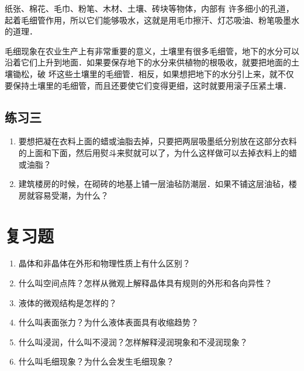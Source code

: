 纸张、棉花、毛巾、粉笔、木材、土壤、砖块等物体，内部有
许多细小的孔道，起着毛细管作用，所以它们能够吸水，这就是用毛巾擦汗、灯芯吸油、粉笔吸墨水的道理．

毛细现象在农业生产上有非常重要的意义，土壤里有很多毛细管，地下的水分可以沿着它们上升到地面．如果要保存地下的水分来供植物的根吸收，就要把地面的土壤锄松，破
坏这些土壤里的毛细管．相反，如果想把地下的水分引上来，就不仅要保持土壤里的毛细管，而且还要使它们变得更细，这时就要用滚子压紧土壤．

\subsection*{练习三}
\begin{enumerate}
\item 要想把凝在衣料上面的蜡或油脂去掉，只要把两层吸墨纸分别放在这部分衣料的上面和下面，然后用熨斗来熨就可以了，为什么这样做可以去掉衣料上的蜡或油脂？
\item 建筑楼房的时候，在砌砖的地基上铺一层油毡防潮层．如果不铺这层油毡，楼房就容易受潮，为什么？
\end{enumerate}

\section*{复习题}

\begin{enumerate}
\item 晶体和非晶体在外形和物理性质上有什么区别？
\item 什么叫空间点阵？怎样从微观上解释晶体具有规则的外形和各向异性？
\item 液体的微观结构是怎样的？
\item 什么叫表面张力？为什么液体表面具有收缩趋势？
\item 什么叫浸润，什么叫不浸润？怎样解释浸润現象和不浸润现象？
\item 什么叫毛细现象？为什么会发生毛细现象？
\end{enumerate}



